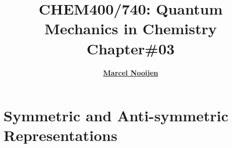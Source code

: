\documentclass[a4paper, 12pt]{article}
\begin{document}
\title{\bf {CHEM400/740: Quantum Mechanics in Chemistry\\ Chapter\#03}} \author{\bf
  \href{http://scienide2.uwaterloo.ca/~nooijen/website_new_20_10_2011/About.html}{Marcel Nooijen}} \date{}
  
\pagestyle{fancy} \fancyhead[L]{\textcolor{PrimaryColor}{CHEM400/740: Quantum Mechanics in Chemistry}} \fancyhead[R]{\textcolor{PrimaryColor}{2021 Winter}}


\maketitle
\tableofcontents

\clearpage


\section{Symmetric and Anti-symmetric Representations}
\end{document}
